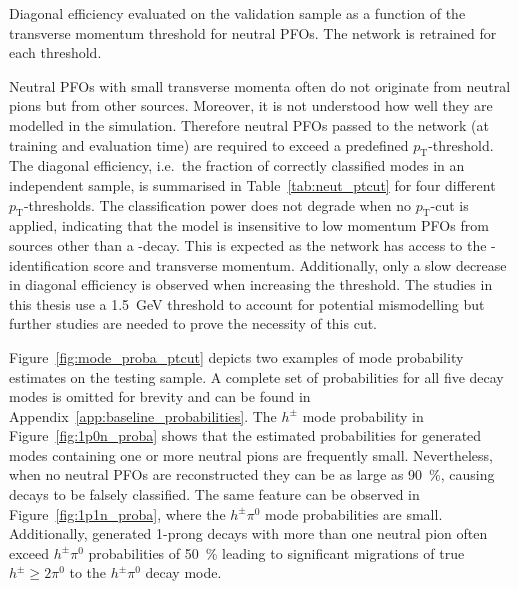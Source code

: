 \begin{table}[htb]
  \centering
  
  \caption{Diagonal efficiency evaluated on the validation sample as a function
    of the transverse momentum threshold for neutral PFOs. The network is
    retrained for each threshold.}
  \label{tab:neut_ptcut}
\end{table}

Neutral PFOs with small transverse momenta often do not originate from neutral
pions but from other sources. Moreover, it is not understood how well they are
modelled in the simulation. Therefore neutral PFOs passed to the network (at
training and evaluation time) are required to exceed a predefined
$p_\text{T}$-threshold. The diagonal efficiency, i.e.\ the fraction of correctly
classified modes in an independent sample, is summarised in
Table~\ref{tab:neut_ptcut} for four different $p_\text{T}$-thresholds. The
classification power does not degrade when no $p_\text{T}$-cut is applied,
indicating that the model is insensitive to low momentum PFOs from sources other
than a -decay. This is expected as the network has access to the
-identification score and transverse momentum. Additionally, only
a slow decrease in diagonal efficiency is observed when increasing the
threshold. The studies in this thesis use a \SI{1.5}{\giga\electronvolt}
threshold to account for potential mismodelling but further studies are needed
to prove the necessity of this cut.

Figure~\ref{fig:mode_proba_ptcut} depicts two examples of mode probability
estimates on the testing sample. A complete set of probabilities for all five
decay modes is omitted for brevity and can be found in
Appendix~\ref{app:baseline_probabilities}. The $h^\pm$ mode probability in
Figure~\ref{fig:1p0n_proba} shows that the estimated probabilities for generated
modes containing one or more neutral pions are frequently small. Nevertheless,
when no neutral PFOs are reconstructed they can be as large as
\SI{90}{\percent}, causing decays to be falsely classified. The same feature can
be observed in Figure~\ref{fig:1p1n_proba}, where the $h^\pm \pi^0$ mode
probabilities are small. Additionally, generated 1-prong decays with more than
one neutral pion often exceed $h^\pm \pi^0$ probabilities of \SI{50}{\percent}
leading to significant migrations of true $h^\pm \geq 2 \pi^0$ to the
$h^\pm \pi^0$ decay mode.

